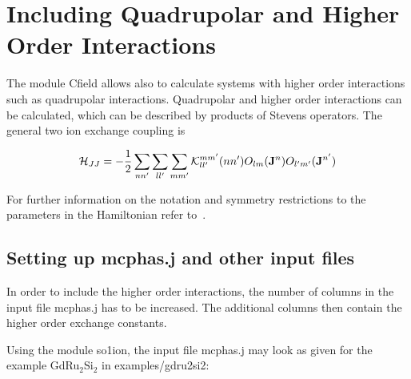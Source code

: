 \section{Including Quadrupolar and Higher Order Interactions}
\label{qint}


The module {\prg Cfield} allows also to calculate systems with higher order interactions such
as quadrupolar interactions. Quadrupolar and higher order interactions can be calculated, which
can be described by products of Stevens operators. The general two ion exchange coupling is

\begin{equation}
\label{multipolehamiltonrepeated}
 {\mathcal H}_{JJ}=
             -\frac{1}{2}  \sum_{nn'} \sum_ {ll'} \sum_{mm'}
     {\mathcal K}_{ll'}^{mm'}(nn') O_{lm}({\mathbf J}^n) O_{l'm'}({\mathbf J}^{n'})
\end{equation}

For further information on the notation and symmetry restrictions to the
parameters in the Hamiltonian refer to~\cite{jensen91-1}.


\subsection{Setting up {\prg mcphas.j} and other input files}

In order to include the higher order interactions, the number of columns in the input file
{\prg mcphas.j} has to be increased. The additional columns then contain the higher order
exchange constants.

Using the module {\prg so1ion}, the input file {\prg mcphas.j} may look as given for the 
example GdRu$_2$Si$_2$ in {\prg examples/gdru2si2}:

